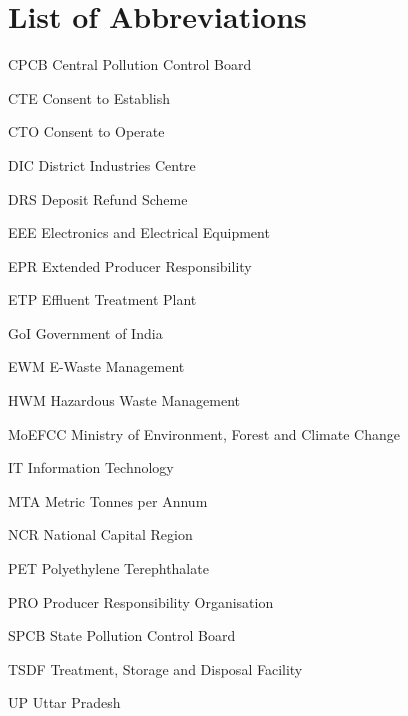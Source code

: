 \documentclass[a4paper, 12pt]{article}
\begin{document}
        \section*{List of Abbreviations}
       
        
        \begin{abbrv}
         
        \item[CPCB]			Central Pollution Control Board
        \item[CTE]				Consent to Establish
        \item[CTO]			Consent to Operate
        \item[DIC]				District Industries Centre
        \item[DRS]			Deposit Refund Scheme
        \item[EEE]				Electronics and Electrical Equipment 
        \item[EPR]				Extended Producer Responsibility
        \item[ETP]				Effluent Treatment Plant 
        \item[GoI]				Government of India
        \item[EWM]			E-Waste Management
        \item[HWM]			Hazardous Waste Management
        \item[MoEFCC]			Ministry of Environment, Forest and Climate Change
        \item[IT]				Information Technology 
        \item[MTA]				Metric Tonnes per Annum
        \item[NCR]			National Capital Region
        \item[PET]				Polyethylene Terephthalate
        \item[PRO]			Producer Responsibility Organisation
        \item[SPCB]			State Pollution Control Board
        \item[TSDF]			Treatment, Storage and Disposal Facility
        \item[UP]				Uttar Pradesh
        
        
         
        \end{abbrv}
        
                    
                    \newpage
\end{document}
